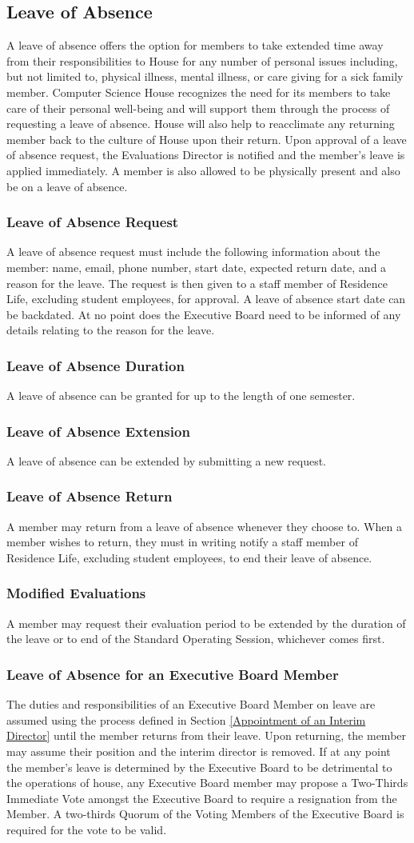 \documentclass{article}
\newcommand{\asection}[1]{\subsection{#1} \label{#1}}
\newcommand{\asubsection}[1]{\subsubsection{#1} \label{#1}}
\begin{document}
\asection{Leave of Absence}
A leave of absence offers the option for members to take extended time away from their responsibilities to House for any number of personal issues including, but not limited to, physical illness, mental illness, or care giving for a sick family member.
Computer Science House recognizes the need for its members to take care of their personal well-being and will support them through the process of requesting a leave of absence.
House will also help to reacclimate any returning member back to the culture of House upon their return.
Upon approval of a leave of absence request, the Evaluations Director is notified and the member's leave is applied immediately.
A member is also allowed to be physically present and also be on a leave of absence.
\asubsection{Leave of Absence Request}
A leave of absence request must include the following information about the member: name, email, phone number, start date, expected return date, and a reason for the leave.
The request is then given to a staff member of Residence Life, excluding student employees, for approval.
A leave of absence start date can be backdated.
At no point does the Executive Board need to be informed of any details relating to the reason for the leave.
\asubsection{Leave of Absence Duration}
A leave of absence can be granted for up to the length of one semester.
\asubsection{Leave of Absence Extension}
A leave of absence can be extended by submitting a new request.
\asubsection{Leave of Absence Return}
A member may return from a leave of absence whenever they choose to.
When a member wishes to return, they must in writing notify a staff member of Residence Life, excluding student employees, to end their leave of absence.
\asubsection{Modified Evaluations}
A member may request their evaluation period to be extended by the duration of the leave or to end of the Standard Operating Session, whichever comes first.
\asubsection{Leave of Absence for an Executive Board Member}
The duties and responsibilities of an Executive Board Member on leave are assumed using the process defined in Section \ref{Appointment of an Interim Director} until the member returns from their leave.
Upon returning, the member may assume their position and the interim director is removed.
If at any point the member's leave is determined by the Executive Board to be detrimental to the operations of house, any Executive Board member may propose a Two-Thirds Immediate Vote amongst the Executive Board to require a resignation from the Member.
A two-thirds Quorum of the Voting Members of the Executive Board is required for the vote to be valid.
\end{document}

